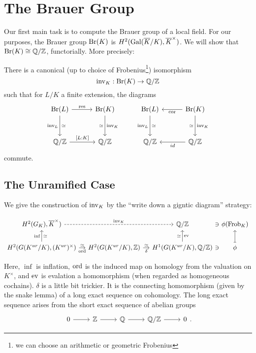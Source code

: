 \documentclass[class=article, crop=false]{standalone}
\begin{document}
\section{The Brauer Group}

Our first main task is to compute the Brauer group of 
a local field. 
For our purposes, the Brauer group \(\operatorname{Br}(K)\) is
\(H^{2}(\operatorname{Gal}(\overline{K} / K),\overline{K}^{\times})\).
We will show that \(\operatorname{Br}(K) \cong \mathbb{Q} / \mathbb{Z}\), 
functorially. More precisely:  

\begin{theorem} \label{thm:br:calc}
	There is a canonical 
	(up to choice of Frobenius\footnote{
	we can choose an arithmetic or geometric Frobenius}) isomorphism
	\[
		\operatorname{inv}_K:\operatorname{Br}(K)\to\mathbb{Q}/\mathbb{Z}
	\] 
	such that for $L/K$ a finite extension, the diagrams
	\[
	\begin{tikzcd}[row sep=3em, column sep=3em]
		\Br(L)\ar[r,"\res"]\ar[d,swap,"\inv_L", "\simeq"'] 
		& \Br(K)\ar[d,"\inv_K","\simeq"']
		& \Br(L)\ar[d,swap,"\inv_L", "\simeq"'] 
		& \Br(K)\ar[l,"\cor"]\ar[d,"\inv_K","\simeq"']\\
		\QQ/\ZZ\ar[r,"{[L:K]}"] 
		& \QQ/\ZZ
		& \QQ/\ZZ
		& \QQ/\ZZ\ar[l,"id"]
	\end{tikzcd}
	\] 
	commute. 
\end{theorem}

\subsection{The Unramified Case}

We give the construction of 
$\operatorname{inv}_K$ by the ``write down a gigntic diagram'' strategy:

\[
	\begin{tikzcd}[column sep=1em]
		H^{2}(\absgal{K},\overline{K}^{\times})
		\ar[rr,dashed,"\inv_K"] & & 
		\QQ/\ZZ &[-1.5em] \ni &[-1.5em] \phi(\Frob_K)\\
		H^{2}(\gal{K^{ur}}{K},(K^{ur})^{\times})
		\ar[r,"\ord"',"\simeq"]\ar[u,"\inf","\simeq"'] & 
		H^{2}(\gal{K^{ur}}{K},\ZZ)\ar[r,"\delta"',"\simeq"] & 
		H^{1}(\gal{K^{ur}}{K},\QQ/\ZZ)\ar[u,"\ev"',"\simeq"] &[-1.5em] \ni &[-1.5em] \phi\ar[u,mapsto] 
\end{tikzcd}
\] 

Here, \(\inf\) is inflation, \(\operatorname{ord}\) is the induced map on homology
from the valuation on \(K^{\times}\), and
\(\operatorname{ev}\) is evalation a homomorphism (when regarded as homogeneous
cochains).
\(\delta\) is a little bit trickier. It is the connecting 
homomorphism (given by the snake lemma) of a long exact sequence
on cohomology. 
The long exact sequence arises from the short exact sequence
of abelian groups
\[
\begin{tikzcd}
0 \arrow{r}{} & \mathbb{Z} \arrow{r}{} & 
\mathbb{Q} \arrow{r}{} & \mathbb{Q} / \mathbb{Z} \arrow{r}{} & 0
\end{tikzcd}
.\]
\end{document}
